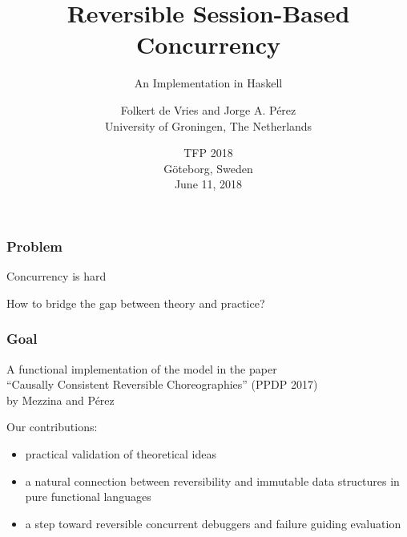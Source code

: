\documentclass[12pt]{beamer}
\institute{}
\title[\textcolor{white}{Reversible Session-Based Concurrency}]{Reversible Session-Based Concurrency}
\subtitle{An Implementation in Haskell}
\author[de Vries \& P\'{e}rez]{{\large Folkert de Vries and  	
Jorge A. P\'{e}rez} \\ [2mm]
University of Groningen, The Netherlands
}
\date[June 11, 2018]
{
TFP 2018\\ G\"{o}teborg, Sweden
\\
June 11, 2018
}
\begin{document}
%
%
%


\begin{frame}

\begin{center}
\maketitle
\end{center}

\end{frame}


\begin{frame}
\frametitle{Problem}
\begin{center}

    \LARGE{Concurrency is hard}

    \Large{How to bridge the gap between theory and practice?}




\end{center}
\end{frame}

\begin{frame}
\frametitle{Goal}
\begin{center}

    A functional implementation of the model in the paper \\ ``Causally Consistent Reversible Choreographies'' (PPDP 2017) \\ by Mezzina and P\'{e}rez 
\end{center}
\bigskip

Our contributions:
\begin{itemize}
    \item practical validation of theoretical ideas
    \item a natural connection between reversibility and immutable data structures in pure functional languages 
    \item a step toward reversible concurrent debuggers and failure guiding evaluation
\end{itemize}


\end{frame}
\end{document}
